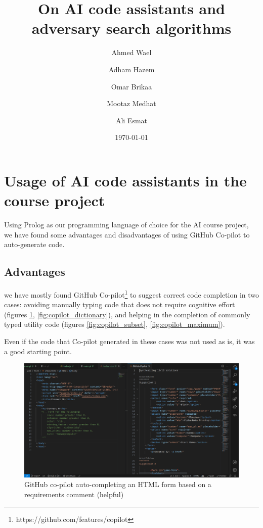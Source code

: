 \documentclass[11pt,a4paper]{article}
\begin{document}
\title{On AI code assistants and adversary search algorithms}
\author{
    Ahmed Wael \and Adham Hazem \and Omar Brikaa \and Mootaz Medhat \and Ali Esmat
}
\date{\today}
\maketitle

\tableofcontents

\section{Usage of AI code assistants in the course project}
Using Prolog as our programming language of choice for the AI course project,
we have found some advantages and disadvantages of using GitHub Co-pilot to auto-generate code.

\subsection{Advantages}
we have mostly found GitHub Co-pilot\footnote{https://github.com/features/copilot} to suggest correct code completion
in two cases:
avoiding manually typing code that does not require cognitive effort
(figures \ref{fig:copilot_html}, \ref{fig:copilot_dictionary}),
and helping in the completion of commonly typed utility code
(figures \ref{fig:copilot_subset}, \ref{fig:copilot_maximum}).

Even if the code that Co-pilot generated in these cases was not used as is, it was a good starting point.

\begin{figure}
    \includegraphics[width=\textwidth]{copilot-helpful-html}
    \caption{GitHub co-pilot auto-completing an HTML form based on a requirements comment (helpful)}
    \label{fig:copilot_html}
\end{figure}
\end{document}
